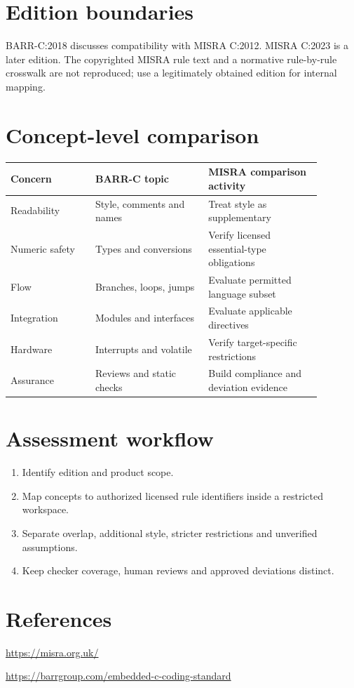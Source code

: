 \documentclass[10pt,letterpaper]{article}
\begin{document}
\makedoctitle
\makedocsummary
\section{Edition boundaries}
BARR-C:2018 discusses compatibility with MISRA C:2012. MISRA C:2023 is a later edition. The copyrighted MISRA rule text and a normative rule-by-rule crosswalk are not reproduced; use a legitimately obtained edition for internal mapping.
\section{Concept-level comparison}
\begin{longtable}{p{0.24\linewidth}p{0.32\linewidth}p{0.32\linewidth}}\toprule Concern & BARR-C topic & MISRA comparison activity\\\midrule\endhead
Readability & Style, comments and names & Treat style as supplementary\\
Numeric safety & Types and conversions & Verify licensed essential-type obligations\\
Flow & Branches, loops, jumps & Evaluate permitted language subset\\
Integration & Modules and interfaces & Evaluate applicable directives\\
Hardware & Interrupts and volatile & Verify target-specific restrictions\\
Assurance & Reviews and static checks & Build compliance and deviation evidence\\
\bottomrule\end{longtable}
\section{Assessment workflow}
\begin{enumerate}
\item Identify edition and product scope.
\item Map concepts to authorized licensed rule identifiers inside a restricted workspace.
\item Separate overlap, additional style, stricter restrictions and unverified assumptions.
\item Keep checker coverage, human reviews and approved deviations distinct.
\end{enumerate}

\section{References}
\url{https://misra.org.uk/}

\url{https://barrgroup.com/embedded-c-coding-standard}
\end{document}
